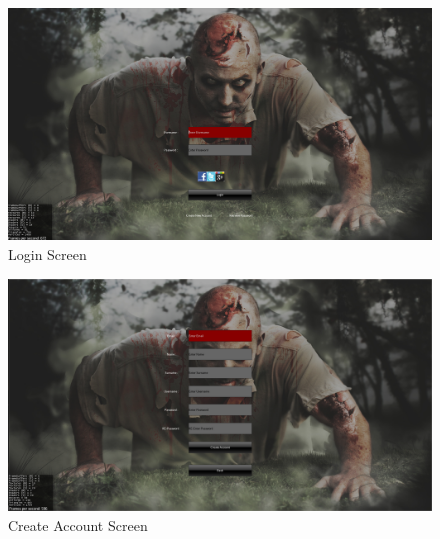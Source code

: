 \documentclass[letterpaper]{article}
\begin{document}
					
		\vspace{0.2in}
		
		\section*{\colorbox{blue}{}} 
		\vspace{0.1in}
		
		\begin{figure}[H]
		\centering
		\includegraphics[width=130mm]		{GUI_ScreenShots/LoginScreen.jpg}
		\caption{Login Screen}
		\end{figure}
		

		
		\begin{figure}[H]
		\centering
		\includegraphics[width=130mm]{GUI_ScreenShots/CreateAccount.jpg}
		\caption{Create Account Screen}
		\end{figure}
		
\end{document}
